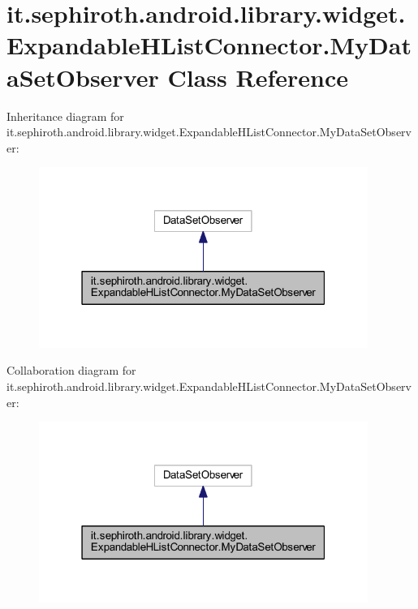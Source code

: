 \hypertarget{classit_1_1sephiroth_1_1android_1_1library_1_1widget_1_1_expandable_h_list_connector_1_1_my_data_set_observer}{}\section{it.\+sephiroth.\+android.\+library.\+widget.\+Expandable\+H\+List\+Connector.\+My\+Data\+Set\+Observer Class Reference}
\label{classit_1_1sephiroth_1_1android_1_1library_1_1widget_1_1_expandable_h_list_connector_1_1_my_data_set_observer}


Inheritance diagram for it.\+sephiroth.\+android.\+library.\+widget.\+Expandable\+H\+List\+Connector.\+My\+Data\+Set\+Observer\+:
\nopagebreak
\begin{figure}[H]
\begin{center}
\leavevmode
\includegraphics[width=304pt]{classit_1_1sephiroth_1_1android_1_1library_1_1widget_1_1_expandable_h_list_connector_1_1_my_data_set_observer__inherit__graph}
\end{center}
\end{figure}


Collaboration diagram for it.\+sephiroth.\+android.\+library.\+widget.\+Expandable\+H\+List\+Connector.\+My\+Data\+Set\+Observer\+:
\nopagebreak
\begin{figure}[H]
\begin{center}
\leavevmode
\includegraphics[width=304pt]{classit_1_1sephiroth_1_1android_1_1library_1_1widget_1_1_expandable_h_list_connector_1_1_my_data_set_observer__coll__graph}
\end{center}
\end{figure}
